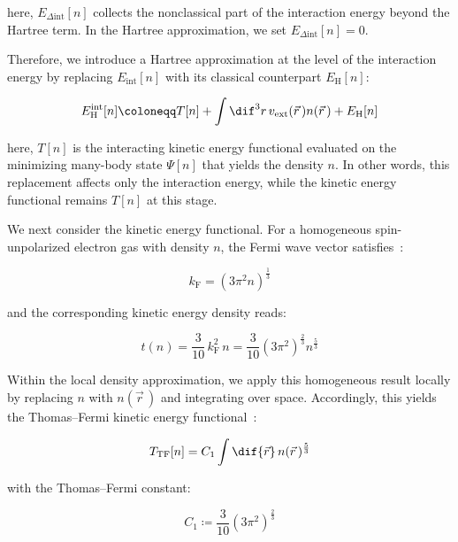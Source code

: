 here, $E_{\Delta\mathrm{int}}[n]$ collects the nonclassical part of the interaction energy beyond the Hartree term.
In the Hartree approximation, we set $E_{\Delta\mathrm{int}}[n]=0$.

Therefore, we introduce a Hartree approximation at the level of the interaction energy by replacing $E_\mathrm{int}[n]$ with its classical counterpart $E_\mathrm{H}[n]$:

\begin{equation}
    E_\mathrm{H}^{\mathrm{int}}[n]
    \coloneqq T[n]
    + \int \dif^3{r}\,v_\mathrm{ext}(\vec{r}\,)n(\vec{r}\,)
    + E_\mathrm{H}[n]
\label{hartree_interaction_level_energy}
\end{equation}

here, $T[n]$ is the interacting kinetic energy functional evaluated on the minimizing many-body state $\Psi[n]$ that yields the density $n$.
In other words, this replacement affects only the interaction energy, while the kinetic energy functional remains $T[n]$ at this stage.

We next consider the kinetic energy functional.
For a homogeneous spin-unpolarized electron gas with density $n$,
the Fermi wave vector satisfies~\cite{simon2013oxford}:

\begin{equation}
    k_\mathrm{F} = \left(3\pi^2 n\right)^{\frac{1}{3}}
\label{Fermi_wave_vector_homogeneous_gas}
\end{equation}

and the corresponding kinetic energy density reads:

\begin{equation}
    t(n) = \frac{3}{10}\,k_\mathrm{F}^2\,n
    = \frac{3}{10}\left(3\pi^2\right)^{\frac{2}{3}}n^{\frac{5}{3}}
\label{kinetic_energy_density_homogeneous_gas}
\end{equation}

Within the local density approximation,
we apply this homogeneous result locally by replacing $n$ with $n(\vec{r}\,)$ and integrating over space.
Accordingly, this yields the Thomas--Fermi kinetic energy functional~\cite{thomas1927calculation,fermi1927metodo,mi2023orbital}:

\begin{equation}
    T_\mathrm{TF}[n] = C_1\int\dif{\vec{r}}\,n(\vec{r}\,)^{\frac{5}{3}}
\label{functional_TTF}
\end{equation}

with the Thomas--Fermi constant:

\begin{equation}
    C_1 \coloneqq \frac{3}{10}\left(3\pi^2\right)^{\frac{2}{3}} 
\label{Thomas_Fermi_constant_C1}
\end{equation}

